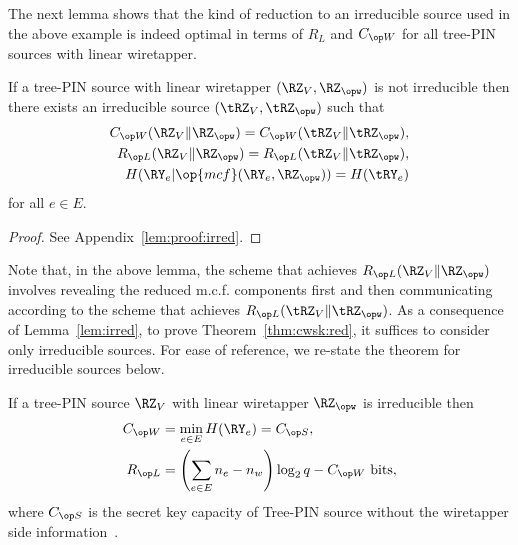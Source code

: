 The next lemma shows that the kind of reduction to an irreducible source used in the above example is indeed optimal in terms of $R_L$ and $\wskc$ for all tree-PIN sources with linear wiretapper.
\begin{lemma}\label{lem:irred} 
 If a tree-PIN source with linear wiretapper $(\RZ_V,\RZ_{\opw})$ is not irreducible then there exists an irreducible source $(\tRZ_V, \tRZ_{\opw})$ such that 
 \begin{align*}
\wskc(\RZ_V\| \RZ_{\opw}) = \wskc(\tRZ_V\|\tRZ_{\opw}),\\ \rl(\RZ_V\|\RZ_{\opw}) = \rl(\tRZ_V\|\tRZ_{\opw}),\\
H(\RY_e|\op{mcf}(\RY_e,\RZ_{\opw})) = H(\tRY_e)
\end{align*}
for all $e \in E$.
\end{lemma}

\begin{proof}
See Appendix~\ref{lem:proof:irred}.
\end{proof}
Note that, in the above lemma, the scheme that achieves $\rl(\RZ_V\|\RZ_{\opw})$  involves revealing the reduced m.c.f. components first and then communicating according to the scheme that achieves $\rl(\tRZ_V\|\tRZ_{\opw})$. As a consequence of Lemma~\ref{lem:irred}, to prove Theorem~\ref{thm:cwsk:red}, it suffices to consider only irreducible sources. For ease of reference, we re-state the theorem for irreducible sources below.

\begin{theorem}\label{thm:cwsk:irred} 
If a tree-PIN source $\RZ_V$ with linear wiretapper $\RZ_{\opw}$ is irreducible then 
\begin{align*}
\wskc &= \min_{e \in E} H(\RY_e)=\skc, \\
\rl &=\left(\sum_{e \in E}n_e -n_w\right)\log_2q- \wskc\text{ bits},
\end{align*}
where $\skc$ is the secret key capacity of Tree-PIN source without the wiretapper side information~\cite{csiszar04}.
\end{theorem}

